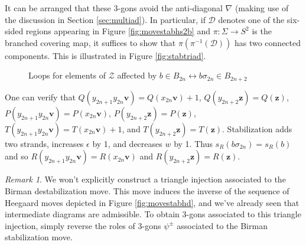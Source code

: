 \documentclass[11pt]{article}
\theoremstyle{plain} \newtheorem{thm}{Theorem}[subsection]
\theoremstyle{plain} \newtheorem{cor}[thm]{Corollary}
\theoremstyle{plain} \newtheorem{prop}[thm]{Proposition}
\theoremstyle{plain} \newtheorem{conj}[thm]{Conjecture}
\theoremstyle{plain} \newtheorem{lem}[thm]{Lemma}
\theoremstyle{definition} \newtheorem{df}[thm]{Definition}
\theoremstyle{remark} \newtheorem{rmk}[thm]{Remark}
\theoremstyle{remark} \newtheorem{obs}[thm]{Observation}
\newcommand{\B}[1]{B_{#1} }
\newcommand{\Zcal}{\mathcal{Z}}
\newcommand{\bv}{\mathbf{v}}
\newcommand{\bz}{\mathbf{z}}
\newcommand{\AD}{\nabla}
\begin{document}
It can be arranged that these 3-gons avoid the anti-diagonal $\AD$ (making use of the discussion in Section \ref{sec:multiad}).  In particular, if $\mathcal{D}$ denotes one of the six-sided regions appearing in Figure \ref{fig:movestabhs2b} and $\pi:\Sigma \rightarrow S^2$ is the branched covering map, it suffices to show that $\pi(\pi^{-1}(\mathcal{D}))$ has two connected components.  This is illustrated in Figure \ref{fig:stabtriad}.

\begin{figure}[h]
\centering
{}\quad
{}\quad
{}\quad
{}
\caption[Grading loops associated to $b \mapsto b \sigma_{2n}$]{Loops for elements of $\Zcal$ affected by $b \in \B{2n} \leftrightarrow b \sigma_{2n} \in \B{2n + 2}$\label{fig:movestabloops}}
\end{figure}

One can verify that $Q(y_{2n+1} y_{2n} \bv )  = Q(x_{2n} \bv ) + 1$, $Q(y_{2n+2} \bz )  = Q(\bz )$, $P(y_{2n+1} y_{2n} \bv )  =  P(x_{2n} \bv )$, $P(y_{2n+2} \bz )  =  P(\bz )$, $T(y_{2n+1} y_{2n} \bv )  = T(x_{2n} \bv ) + 1$, and $T(y_{2n+2} \bz )  = T(\bz )$.  Stabilization adds two strands, increases $\epsilon$ by 1, and decreases $w$ by 1.  Thus $s_{R}(b \sigma_{2n}) = s_{R}(b)$ and so $R(y_{2n+1} y_{2n} \bv )  = R (x_{2n} \bv )$ and $R(y_{2n+2} \bz )  = R(\bz )$.

\begin{rmk}
We won't explicitly construct a triangle injection associated to the Birman destabilization move.  This move induces the inverse of the sequence of Heegaard moves depicted in Figure \ref{fig:movestabhd}, and we've already seen that intermediate diagrams are admissible.   To obtain 3-gons associated to this triangle injection, simply reverse the roles of  3-gons $\psi^{\pm}$ associated to the Birman stabilization move.
\end{rmk}
\end{document}
